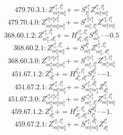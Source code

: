 \documentclass[letterpaper,10pt,fleqn,leqno,onecolumn]{article}
\begin{document}
\begin{equation} \;\;\;\;\;\;  479.70.3.1: Z^{e_{1}^{a},l_{1}^{a}}_{m_{1}^{a}m_{2}^{a}}+=S^{e_{1}^{a}}_{l_{2}^{a}}Z^{l_{1}^{a},l_{2}^{a}}_{m_{1}^{a}m_{2}^{a}} \end{equation}
\begin{equation} \;\;\;\;\;\;  479.70.4.0: Z^{e_{1}^{a}e_{2}^{a}e_{1}^{b}}_{m_{1}^{a}m_{2}^{a}m_{1}^{b}}+=S^{e_{1}^{a}e_{1}^{b}}_{m_{1}^{b},l_{1}^{a}}Z^{e_{2}^{a},l_{1}^{a}}_{m_{1}^{a}m_{2}^{a}} \end{equation}
\begin{equation} \;\;\;\;\;\;  368.60.1.2: Z^{e_{1}^{a},l_{1}^{a}}_{m_{1}^{a},d_{1}^{a}}+=H^{e_{1}^{a},l_{1}^{a}}_{d_{1}^{a},d_{2}^{a}}S^{d_{2}^{a}}_{m_{1}^{a}}\cdot -0.5 \end{equation}
\begin{equation} \;\;\;\;\;\;  368.60.2.1: Z^{e_{1}^{a},l_{1}^{a}}_{m_{1}^{a}m_{2}^{a}}+=S^{d_{1}^{a}}_{m_{1}^{a}}Z^{e_{1}^{a},l_{1}^{a}}_{m_{2}^{a},d_{1}^{a}} \end{equation}
\begin{equation} \;\;\;\;\;\;  368.60.3.0: Z^{e_{1}^{a}e_{2}^{a}e_{1}^{b}}_{m_{1}^{a}m_{2}^{a}m_{1}^{b}}+=S^{e_{1}^{a}e_{1}^{b}}_{m_{1}^{b},l_{1}^{a}}Z^{e_{2}^{a},l_{1}^{a}}_{m_{1}^{a}m_{2}^{a}} \end{equation}
\begin{equation} \;\;\;\;\;\;  451.67.1.2: Z^{l_{1}^{a}}_{d_{1}^{a}}+=H^{l_{1}^{b},l_{1}^{a}}_{d_{1}^{b},d_{1}^{a}}S^{d_{1}^{b}}_{l_{1}^{b}}\cdot -1. \end{equation}
\begin{equation} \;\;\;\;\;\;  451.67.2.1: Z^{e_{1}^{a},l_{1}^{a}}_{m_{1}^{a}m_{2}^{a}}+=S^{e_{1}^{a},d_{1}^{a}}_{m_{1}^{a}m_{2}^{a}}Z^{l_{1}^{a}}_{d_{1}^{a}} \end{equation}
\begin{equation} \;\;\;\;\;\;  451.67.3.0: Z^{e_{1}^{a}e_{2}^{a}e_{1}^{b}}_{m_{1}^{a}m_{2}^{a}m_{1}^{b}}+=S^{e_{1}^{a}e_{1}^{b}}_{m_{1}^{b},l_{1}^{a}}Z^{e_{2}^{a},l_{1}^{a}}_{m_{1}^{a}m_{2}^{a}} \end{equation}
\begin{equation} \;\;\;\;\;\;  459.67.1.2: Z^{l_{1}^{a}}_{d_{1}^{a}}+=H^{l_{1}^{a},l_{2}^{a}}_{d_{1}^{a},d_{2}^{a}}S^{d_{2}^{a}}_{l_{2}^{a}}\cdot -1. \end{equation}
\begin{equation} \;\;\;\;\;\;  459.67.2.1: Z^{e_{1}^{a},l_{1}^{a}}_{m_{1}^{a}m_{2}^{a}}+=S^{e_{1}^{a},d_{1}^{a}}_{m_{1}^{a}m_{2}^{a}}Z^{l_{1}^{a}}_{d_{1}^{a}} \end{equation}
\end{document}
